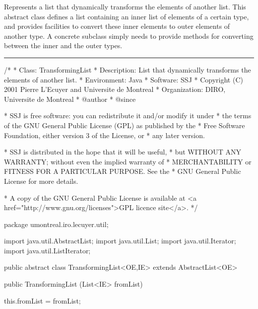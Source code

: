 
Represents a list that dynamically transforms the elements 
of another list.
This abstract class defines a list
containing an inner list of elements of a certain type,
and provides facilities to convert these
inner elements to outer elements of another
type.
A concrete subclass simply needs to provide
methods for converting between the inner
and the outer types.\begin{htmlonly}
\end{htmlonly}


\bigskip\hrule

\begin{code}
\begin{hide}
/*
 * Class:        TransformingList
 * Description:  List that dynamically transforms the elements of another list.
 * Environment:  Java
 * Software:     SSJ 
 * Copyright (C) 2001  Pierre L'Ecuyer and Universite de Montreal
 * Organization: DIRO, Universite de Montreal
 * @author       
 * @since

 * SSJ is free software: you can redistribute it and/or modify it under
 * the terms of the GNU General Public License (GPL) as published by the
 * Free Software Foundation, either version 3 of the License, or
 * any later version.

 * SSJ is distributed in the hope that it will be useful,
 * but WITHOUT ANY WARRANTY; without even the implied warranty of
 * MERCHANTABILITY or FITNESS FOR A PARTICULAR PURPOSE.  See the
 * GNU General Public License for more details.

 * A copy of the GNU General Public License is available at
   <a href="http://www.gnu.org/licenses">GPL licence site</a>.
 */
\end{hide}
package umontreal.iro.lecuyer.util;\begin{hide}

import java.util.AbstractList;
import java.util.List;
import java.util.Iterator;
import java.util.ListIterator;
\end{hide}


public abstract class TransformingList<OE,IE> extends AbstractList<OE>\begin{hide} {
   private List<IE> fromList;
\end{hide}

   public TransformingList (List<IE> fromList)\begin{hide} {
      this.fromList = fromList;
   }\end{hide}
\end{code}
